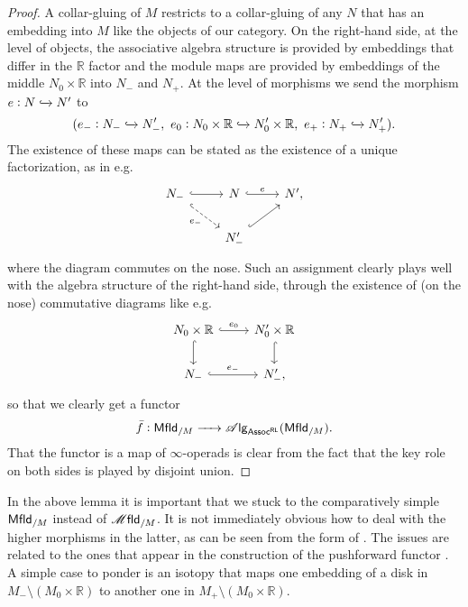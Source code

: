 \documentclass[../text]{subfiles}
\begin{document}
\begin{proof}
    A collar-gluing of $M$ restricts to a collar-gluing of any $N$ that has an embedding into $M$ like the objects of our category. On the right-hand side, at the level of objects, the associative algebra structure is provided by embeddings that differ in the $\mathbb{R}$ factor and the module maps are provided by embeddings of the middle $N_0 \times \mathbb{R}$ into $N_-$ and $N_+$. At the level of morphisms we send the morphism $e: N \xhookrightarrow{} N'$ to
    \begin{equation}
        (e_-: N_- \xhookrightarrow{} N'_-, \ e_0: N_0 \times \mathbb{R} \xhookrightarrow{} N'_0 \times \mathbb{R}, \ e_+: N_+ \xhookrightarrow{} N'_+).
    \end{equation}
    The existence of these maps can be stated as the existence of a unique factorization, as in e.g.
    \begin{equation}\label{cd:factorization_of_e}
        \begin{tikzcd}
            N_- \arrow[r, hook] \arrow[rd, dashed, hook, "e_-"'] & N \arrow[r, hook, "e"] & N', \\
            & N'_- \arrow[ru, hook] &
        \end{tikzcd}
    \end{equation}
    where the diagram commutes on the nose. Such an assignment clearly plays well with the algebra structure of the right-hand side, through the existence of (on the nose) commutative diagrams like e.g.
    \begin{equation}
        \begin{tikzcd}
            N_0 \times \mathbb{R} \arrow[r, hook, "e_0"] \arrow[d, hook] & N'_0 \times \mathbb{R} \arrow[d, hook]\\
            N_- \arrow[r, hook, "e_-"] & N'_-,
            \end{tikzcd}
    \end{equation}
    so that we clearly get a functor
    \begin{equation}
        \bar{f}: \mfld[r]_{/M} \xrightarrow{\ \ \ \ } \alg{\mathsf{Assoc^{RL}}} (\mfld[r]_{/M}).
    \end{equation}
    That the functor is a map of $\infty$-operads is clear from the fact that the key role on both sides is played by disjoint union. 
\end{proof}

\begin{remark}
    In the above lemma it is important that we stuck to the comparatively simple $\mfld[r]_{/M}$ instead of $\mfld_{/M}$. It is not immediately obvious how to deal with the higher morphisms in the latter, as can be seen from the form of . The issues are related to the ones that appear in the construction of the pushforward functor . A simple case to ponder is an isotopy that maps one embedding of a disk in $M_- \setminus (M_0 \times \mathbb{R})$ to another one in $M_+ \setminus (M_0 \times \mathbb{R})$.
\end{remark}
\end{document}
